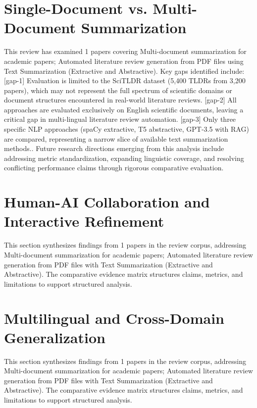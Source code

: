 \documentclass{article}
\begin{document}
\section{Single-Document vs. Multi-Document Summarization}
This review has examined 1 papers covering Multi-document summarization for academic papers; Automated literature review generation from PDF files using Text Summarization (Extractive and Abstractive). Key gaps identified include: [gap-1] Evaluation is limited to the SciTLDR dataset (5,400 TLDRs from 3,200 papers), which may not represent the full spectrum of scientific domains or document structures encountered in real-world literature reviews. [gap-2] All approaches are evaluated exclusively on English scientific documents, leaving a critical gap in multi-lingual literature review automation. [gap-3] Only three specific NLP approaches (spaCy extractive, T5 abstractive, GPT-3.5 with RAG) are compared, representing a narrow slice of available text summarization methods.. Future research directions emerging from this analysis include addressing metric standardization, expanding linguistic coverage, and resolving conflicting performance claims through rigorous comparative evaluation.

\section{Human-AI Collaboration and Interactive Refinement}
This section synthesizes findings from 1 papers in the review corpus, addressing Multi-document summarization for academic papers; Automated literature review generation from PDF files with Text Summarization (Extractive and Abstractive). The comparative evidence matrix structures claims, metrics, and limitations to support structured analysis.

\section{Multilingual and Cross-Domain Generalization}
This section synthesizes findings from 1 papers in the review corpus, addressing Multi-document summarization for academic papers; Automated literature review generation from PDF files with Text Summarization (Extractive and Abstractive). The comparative evidence matrix structures claims, metrics, and limitations to support structured analysis.
\end{document}
